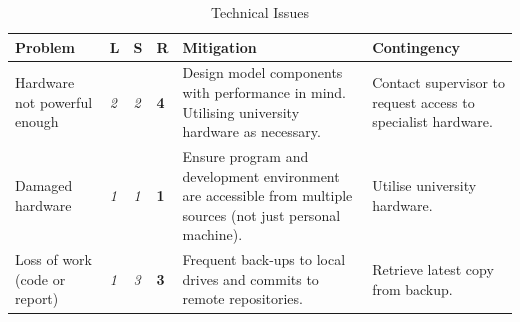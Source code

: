 \documentclass[12pt,a4,xcolor=table]{article}
\begin{document}
	\begin{table}[h!]
		\centering
		\caption{Technical Issues}
		\label{table:risk2}
		\footnotesize
		\begin{tabular}{|>{\centering}m{1.5in} |>{\centering}m{0.1in} |>{\centering}m{0.1in} |>{\centering}m{0.3in} |>{\centering}m{1.8in} |>{\centering\arraybackslash}m{1.8in}|}
			\hline
			\textbf{Problem}              & \textbf{L}                         & \textbf{S}                         & \textbf{R}                         & \textbf{Mitigation}                                                                                          & \textbf{Contingency}                                         \\ \hline
			Hardware not powerful enough  & \cellcolor[HTML]{F8FF00}\textit{2} & \cellcolor[HTML]{F8FF00}\textit{2} & \cellcolor[HTML]{F8FF00}\textbf{4} & Design model components with performance in mind. Utilising university hardware as necessary.                & Contact supervisor to request access to specialist hardware. \\ \hline
			Damaged hardware              & \cellcolor[HTML]{ABCB00}\textit{1} & \cellcolor[HTML]{ABCB00}\textit{1} & \cellcolor[HTML]{ABCB00}\textbf{1} & Ensure program and development environment are accessible from multiple sources (not just personal machine). & Utilise university hardware.                                 \\ \hline
			Loss of work (code or report) & \cellcolor[HTML]{ABCB00}\textit{1} & \cellcolor[HTML]{FFC702}\textit{3} & \cellcolor[HTML]{F8FF00}\textbf{3} & Frequent back-ups to local drives and commits to remote repositories.                                        & Retrieve latest copy from backup.                            \\ \hline
		\end{tabular}
	\end{table}
	
\end{document}
